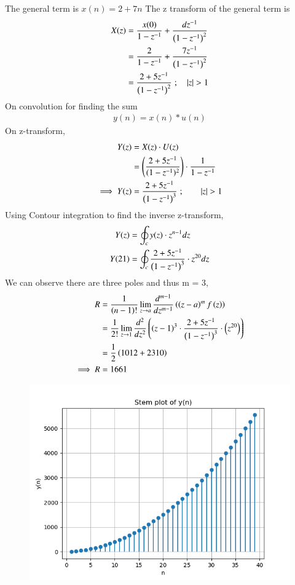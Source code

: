 \documentclass[journal,12pt,twocolumn]{IEEEtran}
\theoremstyle{remark}
\begin{document}
\begin{enumerate}
The general term is $x(n)=2+7n$
The z transform of the general term is 
\begin{align}
X(z)&= \frac{x(0)}{1-z^{-1}}+\frac{dz^{-1}}{\brak{1-z^{-1}}^2} \\
&=\frac{2}{1-z^{-1}}+\frac{7z^{-1}}{{\brak{1-z^{-1}}^2}}\\
&=\frac{2+5z^{-1}}{\brak{1-z^{-1}}^2} \hspace{1mm}; \quad |z|>1\\
\end{align}
On convolution for finding the sum
\begin{align}
    y(n)=x(n)\ast u(n)
\end{align}
On z-transform, 
\begin{align}
Y(z)&=X(z)\cdot U(z)\\
    &=\brak{\frac{{2+5z^{-1}}}{{(1-z^{-1})^2}}} \cdot \frac{1}{{1-z^{-1}}}\\
  \implies Y(z)  &= \frac{2+5z^{-1}}{\brak{1-z^{-1}}^3} \hspace{1mm}; \quad \quad |z|>1\\
\end{align}
Using Contour integration to find the inverse z-transform,
\begin{align}
    Y(z)&=\oint_c y(z)\cdot z^{n-1}dz\\
    Y(21)&=\oint_c \frac{2+5z^{-1}}{\left(1-z^{-1}\right)^3}\cdot z^{20}dz
\end{align}
We can observe there are three poles and thus m = 3,
\begin{align}
    R&=\frac{1}{\left(n-1\right)!} \lim_{z \to a} \frac{d^{m-1}}{dz^{m-1}}\left(\left(z-a\right)^mf\left(z\right)\right)\\
    &=\frac{1}{2!}\lim_{z \to 1} \frac{d^2}{dz^2} \left(\left(z-1\right)^3\cdot \frac{2+5z^{-1}}{\left(1-z^{-1}\right)^3}\cdot \left(z^{20}\right)\right)\\
    &=\frac{1}{2}\left(1012+2310\right)\\
    \implies R&=1661
\end{align}



\begin{figure}[h]
    \centering  

\includegraphics[width=\columnwidth]{fig/sumplot.png}


\end{figure}
\end{enumerate}
\end{document}
